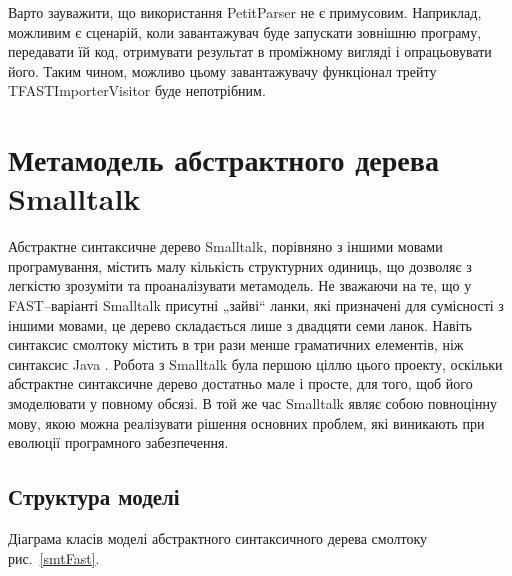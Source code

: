 \documentclass[12pt,a4paper]{article}
\begin{document}
Варто зауважити, що використання PetitParser не є примусовим. Наприклад, можливим є сценарій, коли завантажувач буде запускати зовнішню програму, передавати їй код, отримувати результат в проміжному вигляді і опрацьовувати його. Таким чином, можливо цьому завантажувачу функціонал трейту TFASTImporterVisitor буде непотрібним.

\clearpage

\section{Метамодель абстрактного дерева Smalltalk}

Абстрактне синтаксичне дерево Smalltalk, порівняно з іншими мовами програмування, містить малу кількість структурних одиниць, що дозволяє з легкістю зрозуміти та проаналізувати метамодель. Не зважаючи на те, що у FAST--варіанті Smalltalk присутні „зайві“ ланки, які призначені для сумісності з іншими мовами, це дерево складається лише з двадцяти семи ланок. Навіть синтаксис смолтоку містить в три рази менше граматичних елементів, ніж синтаксис Java \cite{meet-grammars}. Робота з Smalltalk була першою ціллю цього проекту, оскільки абстрактне синтаксичне дерево достатньо мале і просте, для того, щоб його змоделювати у повному обсязі. В той же час Smalltalk являє собою повноцінну мову, якою можна реалізувати рішення основних проблем, які виникають при еволюції програмного забезпечення.

\subsection{Структура моделі}

Діаграма класів моделі абстрактного синтаксичного дерева смолтоку рис.~\ref{smtFast}.
\end{document}
